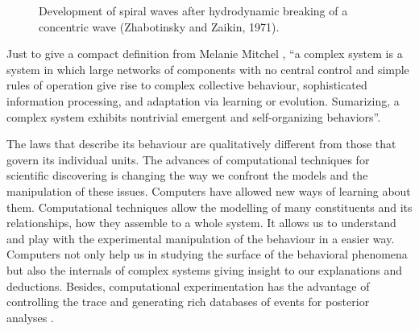 \documentclass[11pt,oneside,a4paper,openright]{report}
\begin{document}
\begin{figure}[h]
\centering
\setlength\fboxsep{0pt}
\setlength\fboxrule{0.5pt}
\caption{ Development of spiral waves after hydrodynamic breaking of a concentric wave (Zhabotinsky and Zaikin, 1971).}
\label{fig:ZhaboZaikin_1}
\end{figure}





Just to give a compact definition from Melanie Mitchel \cite{MelanieMitchell2009}, ``a complex system is a system in
which large networks of components with no central control and simple rules of operation give rise to complex collective behaviour, sophisticated information processing, and adaptation via learning or evolution. Sumarizing, a complex system exhibits nontrivial emergent and self-organizing behaviors''.

The laws that describe its behaviour are qualitatively different from those that govern its individual units.
The advances of computational techniques for scientific discovering is changing the way we confront the models 
and the manipulation of these issues. Computers have allowed new ways of learning about them. Computational techniques 
allow the modelling of many constituents and its relationships, how they assemble to a whole system. It allows us 
to understand and play with the experimental manipulation of the behaviour in a easier way. Computers not only help 
us in studying the surface of the behavioral phenomena but also the internals of complex systems giving insight 
to our explanations and deductions. Besides, computational experimentation has the advantage of controlling the trace 
and generating rich databases of events for posterior analyses \cite{Vicsek2002}.
\end{document}
